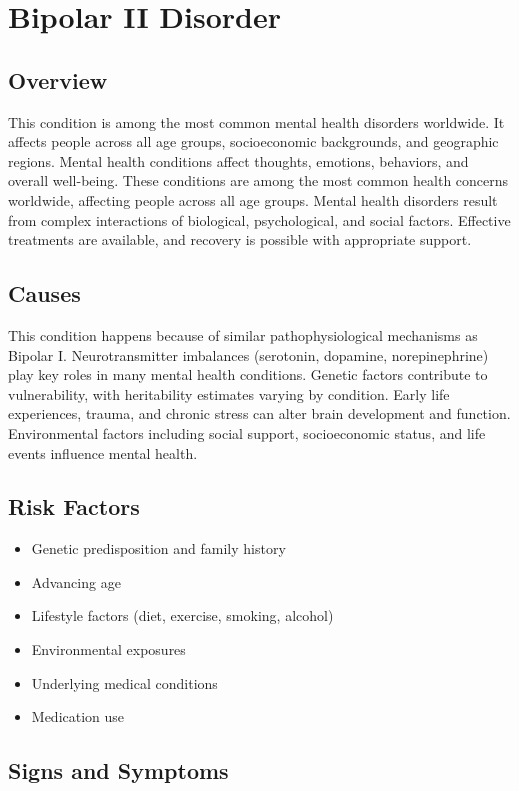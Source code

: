 \chapter{Bipolar II Disorder}
\label{sec:Bipolar II Disorder}

\section{Overview}
This condition is among the most common mental health disorders worldwide. It affects people across all age groups, socioeconomic backgrounds, and geographic regions. Mental health conditions affect thoughts, emotions, behaviors, and overall well-being. These conditions are among the most common health concerns worldwide, affecting people across all age groups. Mental health disorders result from complex interactions of biological, psychological, and social factors. Effective treatments are available, and recovery is possible with appropriate support.
\section{Causes}
This condition happens because of similar pathophysiological mechanisms as Bipolar I.  Neurotransmitter imbalances (serotonin, dopamine, norepinephrine) play key roles in many mental health conditions. Genetic factors contribute to vulnerability, with heritability estimates varying by condition. Early life experiences, trauma, and chronic stress can alter brain development and function. Environmental factors including social support, socioeconomic status, and life events influence mental health.   
\section{Risk Factors}
\begin{itemize}[noitemsep]
  \item Genetic predisposition and family history
  \item Advancing age
  \item Lifestyle factors (diet, exercise, smoking, alcohol)
  \item Environmental exposures
  \item Underlying medical conditions
  \item Medication use
\end{itemize}
\section{Signs and Symptoms}
